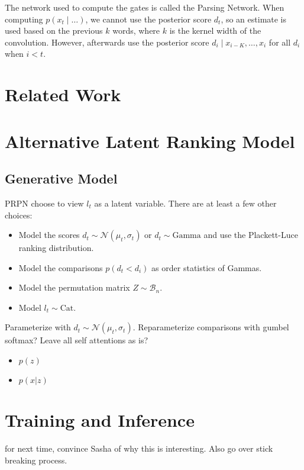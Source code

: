 \documentclass{article}
\begin{document}
The network used to compute the gates is called the Parsing Network.
When computing $p(x_t\mid\ldots)$, we cannot use the posterior score $d_t$,
so an estimate is used based on the previous $k$ words, where $k$ is the 
kernel width of the convolution.
However, afterwards \citet{shen2018prpn} use the posterior score $d_i \mid x_{i-K},\ldots, x_i$
for all $d_i$ when $i < t$.

\begin{comment}
\section{Comparison to CCM \citep{klein-2002-ccm}}
\citep{klein-2002-ccm2}
\citep{golland-2012-ccm,huang-2012-ccm}
\section{Comparison to StructVae \citep{yin18structvae}}
Hm, if we generated context given span, would that encourage non-constituents?
General question about segmental models.
\end{comment}

\section{Related Work}

\section{Alternative Latent Ranking Model}
\subsection{Generative Model}
PRPN \citep{shen2018prpn} choose to view $l_t$ as a latent variable.
There are at least a few other choices:
\begin{itemize}
\item Model the scores $d_t \sim \mathcal{N}(\mu_t,\sigma_t)$
or $d_t \sim \textrm{Gamma}$
and use the Plackett-Luce ranking distribution.
\item Model the comparisons $p(d_t < d_i)$ as order statistics of Gammas.
\item Model the permutation matrix $Z \sim \mathcal{B}_n$.
\item Model $l_t\sim \textrm{Cat}$.
\end{itemize}
Parameterize with $d_t\sim\mathcal{N}(\mu_t, \sigma_t)$.
Reparameterize comparisons with gumbel softmax?
Leave all self attentions as is?
\begin{itemize}
\item $p(z)$
\item $p(x|z)$
\end{itemize}

\section{Training and Inference}

for next time, convince Sasha of why this is interesting.
Also go over stick breaking process.



\end{document}
